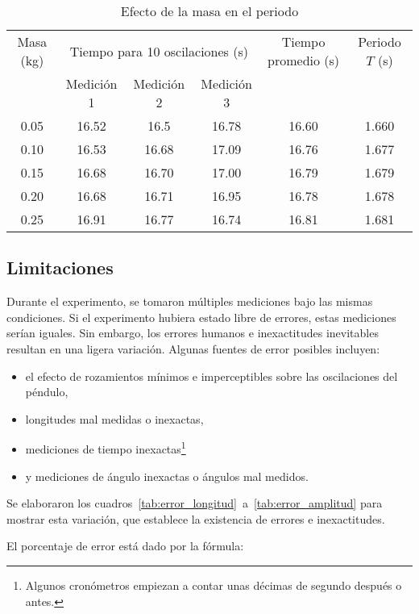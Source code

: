 \documentclass[letterpaper]{report}
\numberwithin{table}{section}
\begin{document}
\begin{table}[ht]
  \centering
  \begin{tabular}{cccccc}
    \toprule
    Masa (kg) & \multicolumn{3}{c}{Tiempo para 10 oscilaciones
    (s)} & Tiempo promedio (s) & Periodo $T$ (s) \\
    \cmidrule(lr){2-4}
    & Medición 1 & Medición 2 & Medición 3 &  &  \\
    \midrule
    0.05  & 16.52 & 16.5  & 16.78 & 16.60 & 1.660 \\
    0.10  & 16.53 & 16.68 & 17.09 & 16.76 & 1.677 \\
    0.15  & 16.68 & 16.70 & 17.00 & 16.79 & 1.679 \\
    0.20  & 16.68 & 16.71 & 16.95 & 16.78 & 1.678 \\
    0.25  & 16.91 & 16.77 & 16.74 & 16.81 & 1.681 \\
    \bottomrule
  \end{tabular}
  \caption{Efecto de la masa en el periodo}\label{tab:masa_periodo}
\end{table}

\subsection{Limitaciones}

Durante el experimento, se tomaron múltiples mediciones bajo las mismas
condiciones. Si el experimento hubiera estado libre de errores, estas
mediciones serían iguales. Sin embargo, los errores humanos e inexactitudes
inevitables resultan en una ligera variación. Algunas fuentes de
error posibles incluyen:

\begin{itemize}
  \item el efecto de rozamientos mínimos e imperceptibles sobre las
    oscilaciones del péndulo,
  \item longitudes mal medidas o inexactas,
  \item mediciones de tiempo inexactas\footnote{Algunos cronómetros
    empiezan a contar unas décimas de segundo después o antes.}
  \item y mediciones de ángulo inexactas o ángulos mal medidos.
\end{itemize}

Se elaboraron los cuadros~\ref{tab:error_longitud}~a~\ref{tab:error_amplitud}
para mostrar esta variación, que establece la existencia de errores e
inexactitudes.

El porcentaje de error está dado por la fórmula:
\end{document}

